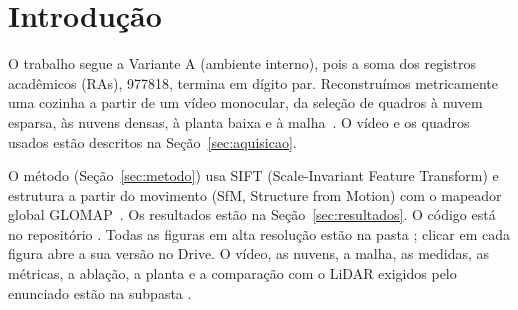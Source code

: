 \section{Introdução}
\label{sec:introducao}

O trabalho segue a Variante A (ambiente interno), pois a soma dos registros acadêmicos (RAs), 977818, termina em dígito par. Reconstruímos metricamente uma cozinha a partir de um vídeo monocular, da seleção de quadros à nuvem esparsa, às nuvens densas, à planta baixa e à malha~\cite{hartley2004multiple,schoenberger2016sfm}. O vídeo e os quadros usados estão descritos na Seção~\ref{sec:aquisicao}. %

O método (Seção~\ref{sec:metodo}) usa SIFT (Scale-Invariant Feature Transform) e estrutura a partir do movimento (SfM, Structure from Motion) com o mapeador global GLOMAP~\cite{pan2024glomap}.
Os resultados estão na Seção~\ref{sec:resultados}. O código está no repositório \href{https://github.com/oliveiraMats2/3d_indoor_environment}{}. Todas as figuras em alta resolução estão na pasta \href{https://drive.google.com/drive/folders/1zD92kOM3-jJZeM48MSD7dSlieicfB6Qa}{}; clicar em cada figura abre a sua versão no Drive. O vídeo, as nuvens, a malha, as medidas, as métricas, a ablação, a planta e a comparação com o LiDAR exigidos pelo enunciado estão na subpasta \href{https://drive.google.com/drive/folders/1tiqDEpNtPre5AfVaHxmzFQ1o4eBh0snh}{}.
